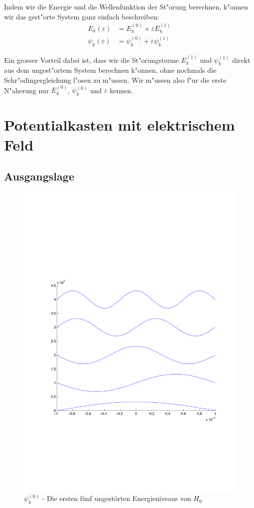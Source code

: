 \begin{refsection}
Indem wir die Energie und die Wellenfunktion der St"orung berechnen, k"onnen wir das gest"orte System ganz einfach beschreiben:
\begin{equation}
\begin{aligned}
E_k(\varepsilon)&=E_k^{(0)} + \varepsilon E_k^{(1)}
\\
\psi_k(\varepsilon)&=\psi_k^{(0)} + \varepsilon \psi_k^{(1)}
\end{aligned}
\end{equation}

Ein grosser Vorteil dabei ist,
dass wir die St"orungsterme $E_k^{(1)}$ und $\psi_k^{(1)}$
direkt aus dem ungest"ortem System berechnen k"onnen,
ohne nochmals die Schr"odingergleichung l"osen zu m"ussen.
Wir m"ussen also f"ur die erste N"aherung nur $E_k^{(0)}$,
$\psi_k^{(0)}$ und $\varepsilon$ kennen.




\section{Potentialkasten mit elektrischem Feld}

\subsection{Ausgangslage}

\begin{figure}
 \centering
 \includegraphics[width=12cm,clip=true,trim=2cm 7cm 1cm 8cm]{efeld/Psi_ungestoert.pdf}
 \caption{$\psi_k^{(0)}$ - Die ersten f\"unf ungest\"orten Energieniveaus von $H_0$ }
 \label{abb:efeld_psi_ungestoert}
\end{figure}


\end{refsection}

